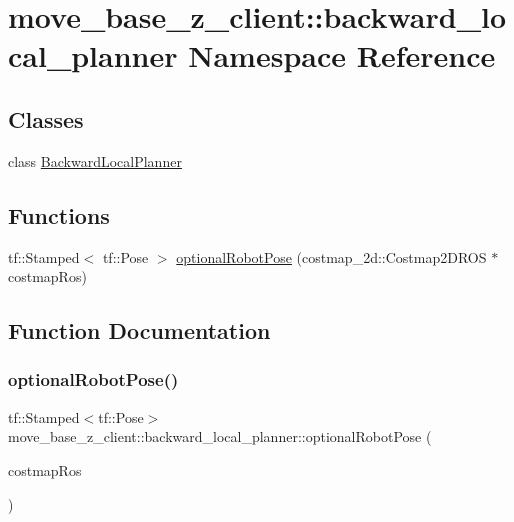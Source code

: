 \hypertarget{namespacemove__base__z__client_1_1backward__local__planner}{}\section{move\+\_\+base\+\_\+z\+\_\+client\+:\+:backward\+\_\+local\+\_\+planner Namespace Reference}
\label{namespacemove__base__z__client_1_1backward__local__planner}
\subsection*{Classes}
\begin{DoxyCompactItemize}
\item 
class \hyperlink{classmove__base__z__client_1_1backward__local__planner_1_1BackwardLocalPlanner}{Backward\+Local\+Planner}
\end{DoxyCompactItemize}
\subsection*{Functions}
\begin{DoxyCompactItemize}
\item 
tf\+::\+Stamped$<$ tf\+::\+Pose $>$ \hyperlink{namespacemove__base__z__client_1_1backward__local__planner_a80dbd10807e5f70adfcd0ff4dcb7c1db}{optional\+Robot\+Pose} (costmap\+\_\+2d\+::\+Costmap2\+D\+R\+OS $\ast$costmap\+Ros)
\end{DoxyCompactItemize}


\subsection{Function Documentation}
\mbox{\label{namespacemove__base__z__client_1_1backward__local__planner_a80dbd10807e5f70adfcd0ff4dcb7c1db}} 
\subsubsection{\texorpdfstring{optional\+Robot\+Pose()}{optionalRobotPose()}}
{\footnotesize\ttfamily tf\+::\+Stamped$<$tf\+::\+Pose$>$ move\+\_\+base\+\_\+z\+\_\+client\+::backward\+\_\+local\+\_\+planner\+::optional\+Robot\+Pose (\begin{DoxyParamCaption}\item[{costmap\+\_\+2d\+::\+Costmap2\+D\+R\+OS $\ast$}]{costmap\+Ros }\end{DoxyParamCaption})}




